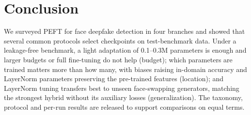 \documentclass[fonts]{icst}
\begin{document}
\section{Conclusion}
We surveyed PEFT for face deepfake detection in four branches and showed that several common protocols select checkpoints on test-benchmark data. Under a leakage-free benchmark, a light adaptation of 0.1--0.3M parameters is enough and larger budgets or full fine-tuning do not help (budget); which parameters are trained matters more than how many, with biases raising in-domain accuracy and LayerNorm parameters preserving the pre-trained features (location); and LayerNorm tuning transfers best to unseen face-swapping generators, matching the strongest hybrid without its auxiliary losses (generalization). The taxonomy, protocol and per-run results are released to support comparisons on equal terms.
\end{document}
